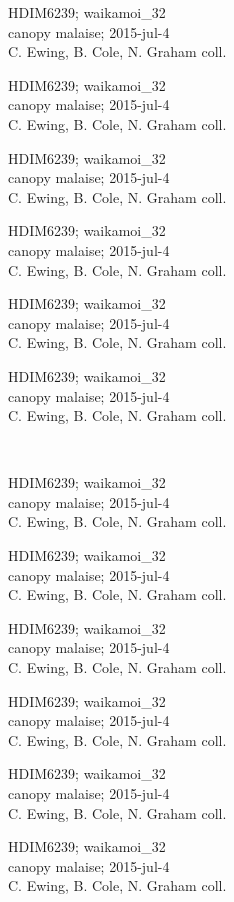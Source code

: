 \documentclass[2pt]{extarticle}
\begin{document}
\noindent
\parbox{0.16\textwidth}{\tiny \raggedright \rule[-0.3\baselineskip]{0pt}{10pt}HDIM6239; waikamoi\_32\\ canopy malaise; 2015-jul-4\\ C. Ewing, B. Cole, N. Graham coll.}
\parbox{0.16\textwidth}{\tiny \raggedright \rule[-0.3\baselineskip]{0pt}{10pt}HDIM6239; waikamoi\_32\\ canopy malaise; 2015-jul-4\\ C. Ewing, B. Cole, N. Graham coll.}
\parbox{0.16\textwidth}{\tiny \raggedright \rule[-0.3\baselineskip]{0pt}{10pt}HDIM6239; waikamoi\_32\\ canopy malaise; 2015-jul-4\\ C. Ewing, B. Cole, N. Graham coll.}
\parbox{0.16\textwidth}{\tiny \raggedright \rule[-0.3\baselineskip]{0pt}{10pt}HDIM6239; waikamoi\_32\\ canopy malaise; 2015-jul-4\\ C. Ewing, B. Cole, N. Graham coll.}
\parbox{0.16\textwidth}{\tiny \raggedright \rule[-0.3\baselineskip]{0pt}{10pt}HDIM6239; waikamoi\_32\\ canopy malaise; 2015-jul-4\\ C. Ewing, B. Cole, N. Graham coll.}
\parbox{0.16\textwidth}{\tiny \raggedright \rule[-0.3\baselineskip]{0pt}{10pt}HDIM6239; waikamoi\_32\\ canopy malaise; 2015-jul-4\\ C. Ewing, B. Cole, N. Graham coll.} \\ 
\vspace{0.001in} 

\noindent
\parbox{0.16\textwidth}{\tiny \raggedright \rule[-0.3\baselineskip]{0pt}{10pt}HDIM6239; waikamoi\_32\\ canopy malaise; 2015-jul-4\\ C. Ewing, B. Cole, N. Graham coll.}
\parbox{0.16\textwidth}{\tiny \raggedright \rule[-0.3\baselineskip]{0pt}{10pt}HDIM6239; waikamoi\_32\\ canopy malaise; 2015-jul-4\\ C. Ewing, B. Cole, N. Graham coll.}
\parbox{0.16\textwidth}{\tiny \raggedright \rule[-0.3\baselineskip]{0pt}{10pt}HDIM6239; waikamoi\_32\\ canopy malaise; 2015-jul-4\\ C. Ewing, B. Cole, N. Graham coll.}
\parbox{0.16\textwidth}{\tiny \raggedright \rule[-0.3\baselineskip]{0pt}{10pt}HDIM6239; waikamoi\_32\\ canopy malaise; 2015-jul-4\\ C. Ewing, B. Cole, N. Graham coll.}
\parbox{0.16\textwidth}{\tiny \raggedright \rule[-0.3\baselineskip]{0pt}{10pt}HDIM6239; waikamoi\_32\\ canopy malaise; 2015-jul-4\\ C. Ewing, B. Cole, N. Graham coll.}
\parbox{0.16\textwidth}{\tiny \raggedright \rule[-0.3\baselineskip]{0pt}{10pt}HDIM6239; waikamoi\_32\\ canopy malaise; 2015-jul-4\\ C. Ewing, B. Cole, N. Graham coll.} \\ 
\vspace{0.001in} 
\end{document}
